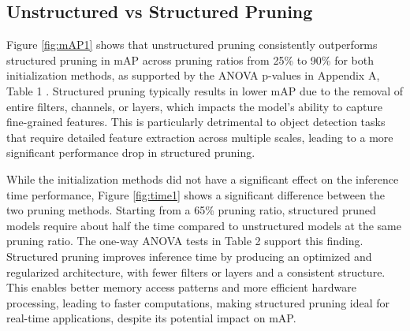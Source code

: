 \documentclass[10pt]{cai}
\begin{document}
\subsection{Unstructured vs Structured Pruning}
\label{sec2}
Figure \ref{fig:mAP1} shows that unstructured pruning consistently outperforms structured pruning in mAP across pruning ratios from 25\% to 90\% for both initialization methods, as supported by the ANOVA p-values in Appendix A, Table 1 \cite{MyAppendix}. Structured pruning typically results in lower mAP due to the removal of entire filters, channels, or layers, which impacts the model’s ability to capture fine-grained features. This is particularly detrimental to object detection tasks that require detailed feature extraction across multiple scales, leading to a more significant performance drop in structured pruning.

While the initialization methods did not have a significant effect on the inference time performance, Figure \ref{fig:time1} shows a significant difference between the two pruning methods. Starting from a 65\% pruning ratio, structured pruned models require about half the time compared to unstructured models at the same pruning ratio. The one-way ANOVA tests in Table 2 \cite{MyAppendix} support this finding. Structured pruning improves inference time by producing an optimized and regularized architecture, with fewer filters or layers and a consistent structure. This enables better memory access patterns and more efficient hardware processing, leading to faster computations, making structured pruning ideal for real-time applications, despite its potential impact on mAP.
\end{document}
